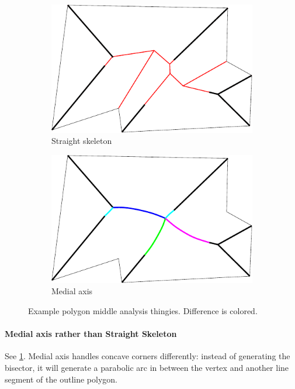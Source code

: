\begin{figure}
\begin{subfigure}{0.45\columnwidth}
\includegraphics[width=\columnwidth]{sources/method/example_straight_skeleton.pdf}
\caption{Straight skeleton}
\end{subfigure}
\begin{subfigure}{0.45\columnwidth}
\includegraphics[width=\columnwidth]{sources/method/example_medial_axis.pdf}
\caption{Medial axis}
\end{subfigure}
\caption{Example polygon middle analysis thingies. Difference is colored.}
\label{medial_axis_vs_straight_skeleton}
\end{figure}


\paragraph{Medial axis rather than Straight Skeleton}
See \cref{medial_axis_vs_straight_skeleton}.
Medial axis handles concave corners differently:
instead of generating the bisector, it will generate a parabolic arc in between the vertex and another line segment of the outline polygon.

